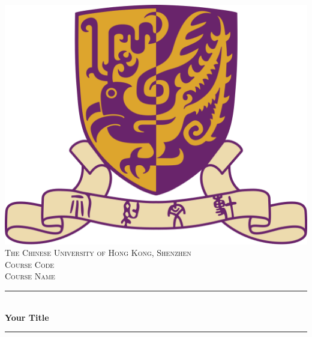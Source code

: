 \documentclass[12pt,a4paper]{report}
\begin{document}
\begin{titlepage}

    \newcommand{\HRule}{\rule{\linewidth}{0.5mm}}

    \center
    \vspace*{1.5cm}


    \includegraphics[scale=.2]{src/cuhk.png}\\[1cm]
    \textsc{\large The Chinese University of Hong Kong, Shenzhen}\\[1.5cm]

    \textsc{\Large Course Code}\\[0.5cm]

    \textsc{\large Course Name}\\[0.5cm]


    \HRule \\[0.4cm]
    { \huge \bfseries Your Title}
    \HRule \\[1.5cm]



\end{titlepage}
\end{document}
